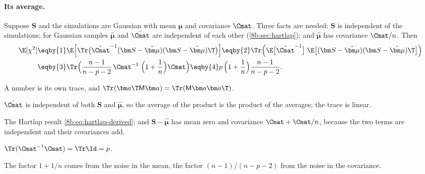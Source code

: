 \paragraph{Its average.} Suppose $\bm S$ and the simulations are Gaussian with mean $\bm\mu$ and covariance $\Cmat$. Three
facts are needed: $\bm S$ is independent of the simulations; for Gaussian samples $\hat{\bm\mu}$ and $\hat\Cmat$ are
independent of each other (\cref{8b:sec:hartlap}); and $\hat{\bm\mu}$ has covariance $\Cmat/n$. Then
\begin{align}
  \E[\chi^2]
  &\eqby{1}\E\Bigl[\Tr\bigl(\hat\Cmat^{-1}(\bm S-\hat{\bm\mu})(\bm S-\hat{\bm\mu})\T\bigr)\Bigr]
   \eqby{2}\Tr\Bigl(\E\bigl[\hat\Cmat^{-1}\bigr]\;\E\bigl[(\bm S-\hat{\bm\mu})(\bm S-\hat{\bm\mu})\T\bigr]\Bigr)\nonumber\\
  &\eqby{3}\Tr\Bigl(\frac{n-1}{n-p-2}\,\Cmat^{-1}\;\Bigl(1+\frac1n\Bigr)\Cmat\Bigr)
   \eqby{4}p\,\Bigl(1+\frac1n\Bigr)\frac{n-1}{n-p-2} .
  \label{12c:eq:chi2-mean}
\end{align}
\begin{explain}
  \item A number is its own trace, and $\Tr(\bm a\T\mathsf M\bm a)=\Tr(\mathsf M\bm a\bm a\T)$.
  \item $\hat\Cmat$ is independent of both $\bm S$ and $\hat{\bm\mu}$, so the average of the product is the product of the
        averages; the trace is linear.
  \item The Hartlap result \eqref{8b:eq:hartlap-derived}; and $\bm S-\hat{\bm\mu}$ has mean zero and covariance
        $\Cmat+\Cmat/n$, because the two terms are independent and their covariances add.
  \item $\Tr(\Cmat^{-1}\Cmat)=\Tr\Id=p$.
\end{explain}
The factor $1+1/n$ comes from the noise in the mean, the factor $(n-1)/(n-p-2)$ from the noise in the covariance.

